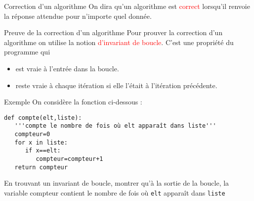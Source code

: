 \documentclass[10pt]{beamer}
\begin{document}
\begin{frame}
	\mframe{\NA}
	\begin{alertblock}{Correction d'un algorithme}
		On dira qu'un algorithme est \textcolor{red}{correct}
		\onslide<2-> lorsqu'il renvoie la réponse attendue pour n'importe quel donnée.
	\end{alertblock}
\end{frame}

\begin{frame}
	\mframe{\NA}
	\begin{alertblock}{Preuve de la correction d'un algorithme}
		Pour prouver la correction d'un algorithme on utilise la notion \textcolor{red}{d'invariant de boucle}. C'est une propriété du programme qui
		\begin{itemize}[label=\textbullet]
			\item<2-> est vraie à l'entrée dans la boucle.
			\item<3-> reste vraie à chaque itération si elle l'était à l'itération précédente.
		\end{itemize}
	\end{alertblock}
\end{frame}

\begin{frame}[fragile]
	\mframe{\NA}
	\begin{exampleblock}{Exemple}
		On considère la fonction ci-dessous :
		\begin{lstlisting}
def compte(elt,liste):
   '''compte le nombre de fois où elt apparaît dans liste'''
   compteur=0
   for x in liste:
      if x==elt:
         compteur=compteur+1
   return compteur
\end{lstlisting}
		 En trouvant un invariant de boucle, montrer qu'à la sortie de la boucle, la variable compteur contient le nombre de fois où \texttt{elt} apparaît dans \texttt{liste}
	\end{exampleblock}
\end{frame}
\end{document}
